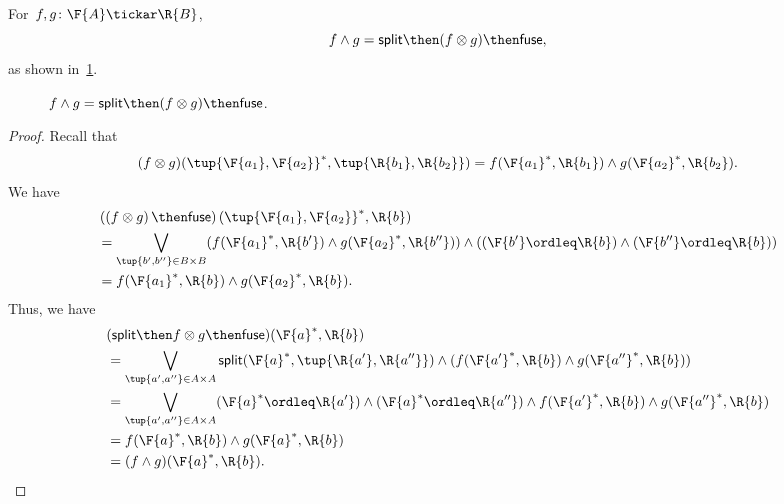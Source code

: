 \begin{lemma}
\label{lemma:intersection}
For~$f,g \colon \F{A} \tickar \R{B}$,
\begin{equation}
f \wedge g = \mathsf{split} \then (f \otimes g) \then \mathsf{fuse},
\end{equation}
as shown in~\cref{fig:lemmasplitfuse}.
\begin{figure}[h!]
\begin{center}
\end{center}
\caption{$f \wedge g = \mathsf{split} \then (f \otimes g) \then \mathsf{fuse}$. \label{fig:lemmasplitfuse}}
\end{figure}
\end{lemma}


\begin{proof}
Recall that 
    \begin{equation}
        (f\otimes g)(\tup{\F{a_1},\F{a_2}}^*,\tup{\R{b_1},\R{b_2}})=f(\F{a_1}^*,\R{b_1})\wedge g(\F{a_2}^*,\R{b_2}).
    \end{equation}
We have
    \begin{equation}
        \begin{aligned}
            &\left(\left(f\otimes g\right) \then \mathsf{fuse}\right)(\tup{\F{a_1},\F{a_2}}^*,\R{b})\\
            &=\bigvee_{\tup{b',b''}\in B\times B}(f(\F{a_1}^*,\R{b'})\wedge g(\F{a_2}^*,\R{b''}))\wedge ((\F{b'}\ordleq \R{b}) \wedge (\F{b''}\ordleq \R{b}))\\
            &=f(\F{a_1}^*,\R{b})\wedge g(\F{a_2}^*,\R{b}).
        \end{aligned}
    \end{equation}
Thus, we have
    \begin{equation}
        \begin{aligned}
        &(\mathsf{split}\then f\otimes g\then \mathsf{fuse})(\F{a}^*,\R{b})\\&=\bigvee_{\tup{a',a''}\in A\times A} \mathsf{split}(\F{a}^*,\tup{\R{a'},\R{a''}})\wedge (f(\F{a'}^*,\R{b})\wedge g(\F{a''}^*,\R{b}))\\
        &=\bigvee_{\tup{a',a''}\in A\times A}(\F{a}^*\ordleq \R{a'})\wedge (\F{a}^*\ordleq \R{a''})\wedge f(\F{a'}^*,\R{b})\wedge g(\F{a''}^*,\R{b})\\
        &=f(\F{a}^*,\R{b})\wedge g(\F{a}^*,\R{b})\\
        &=(f\wedge g)(\F{a}^*,\R{b}).
        \end{aligned}
    \end{equation}
\end{proof}

